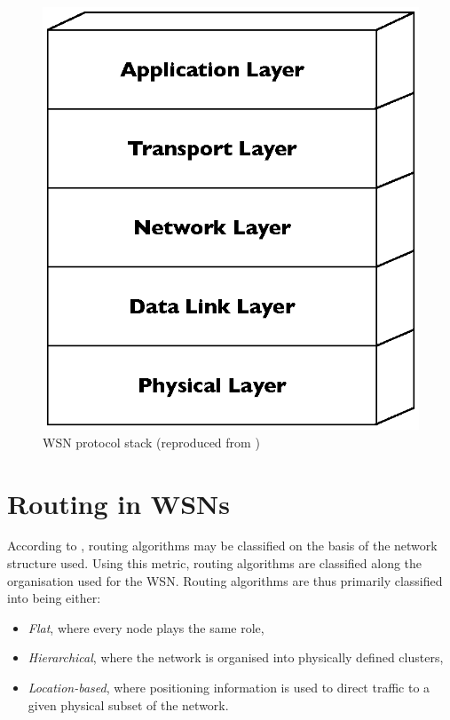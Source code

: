 \begin{figure}[h]
\centering
\includegraphics[scale=0.65]{img/ProtStack.eps}
\caption[WSN protocol stack]{WSN protocol stack (reproduced from \cite{SensorSurveyAkyildiz:2002})}
\label{Fig:ProtStack}
\end{figure}

\section {Routing in WSNs}

According to \cite{routing:2004}, routing algorithms may
be classified on the basis of the network structure used. Using this metric,
routing algorithms are classified along the organisation used for the WSN.
Routing algorithms are thus primarily classified into being either:
\begin{itemize}
\item \emph{Flat}, where every node plays the same role, 
\item \emph{Hierarchical}, where the network is organised into physically
defined clusters,
\item \emph{Location-based}, where positioning information is used to direct traffic to a given physical subset of
the network.
\end{itemize}


